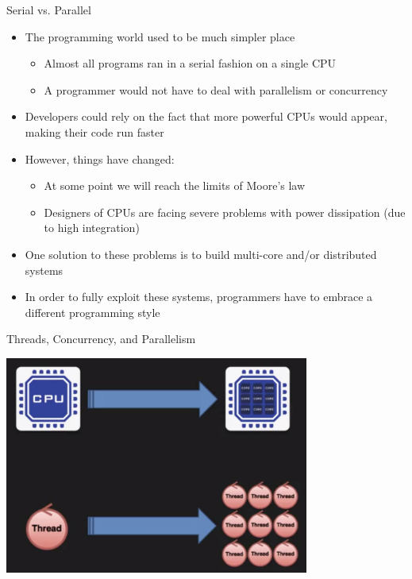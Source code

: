 \documentclass[12pt,xcolor=svgnames]{beamer}
\begin{document}
\begin{frame}{Serial vs. Parallel}

\begin{itemize}
\item The programming world used to be much simpler place
\begin{itemize}
\item Almost all programs ran in a serial fashion on a single CPU
\item A programmer would not have to deal with parallelism or concurrency 
\end{itemize}
\item Developers could rely on the fact that more powerful CPUs would appear, making their code run faster
\end{itemize}

\framebreak

\begin{itemize}

\item However, things have changed:
\begin{itemize}
\item At some point we will reach the limits of Moore's law
\item Designers of CPUs are facing severe problems with power dissipation (due to high integration)
\end{itemize}
\item One solution to these problems is to build multi-core and/or distributed systems
\item In order to fully exploit these systems, programmers have to embrace a different programming style
\end{itemize}
\end{frame}


\begin{frame}{Threads, Concurrency, and Parallelism}
\centerline{\includegraphics[width=0.75\textwidth]{images/threads}}	
\end{frame}
\end{document}
